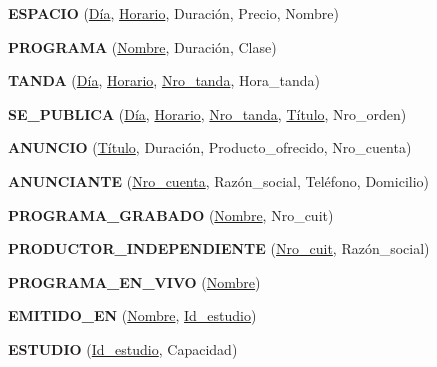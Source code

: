 \documentclass[a4paper,10pt]{article}
\begin{document}
    \begin{flushleft}
      {\bf{ESPACIO}} (\underline{D\'ia}, \underline{Horario}, Duraci\'on, Precio, Nombre)
    \end{flushleft} 
 
    \begin{flushleft}
      {\bf{PROGRAMA}} (\underline{Nombre}, Duraci\'on, Clase)
    \end{flushleft} 

    \begin{flushleft}
      {\bf{TANDA}} (\underline{D\'ia}, \underline{Horario}, \underline{Nro\_tanda}, Hora\_tanda)
    \end{flushleft} 

    \begin{flushleft}
      {\bf{SE\_PUBLICA}} (\underline{D\'ia}, \underline{Horario}, \underline{Nro\_tanda}, \underline{T\'itulo}, Nro\_orden)    
    \end{flushleft}

    \begin{flushleft}
      {\bf{ANUNCIO}} (\underline{T\'itulo}, Duraci\'on, Producto\_ofrecido, Nro\_cuenta)
    \end{flushleft}

    \begin{flushleft}
      {\bf{ANUNCIANTE}} (\underline{Nro\_cuenta}, Raz\'on\_social, Tel\'efono, Domicilio)
    \end{flushleft}

    \begin{flushleft}
      {\bf{PROGRAMA\_GRABADO}} (\underline{Nombre}, Nro\_cuit)
    \end{flushleft}
   
    \begin{flushleft}
      {\bf{PRODUCTOR\_INDEPENDIENTE}} (\underline{Nro\_cuit}, Raz\'on\_social)
    \end{flushleft}
  
    \begin{flushleft}
      {\bf{PROGRAMA\_EN\_VIVO}} (\underline{Nombre})
    \end{flushleft}

    \begin{flushleft}
      {\bf{EMITIDO\_EN}} (\underline{Nombre}, \underline{Id\_estudio})
    \end{flushleft}
  
    \begin{flushleft}
      {\bf{ESTUDIO}} (\underline{Id\_estudio}, Capacidad)
    \end{flushleft}
  
\end{document}
